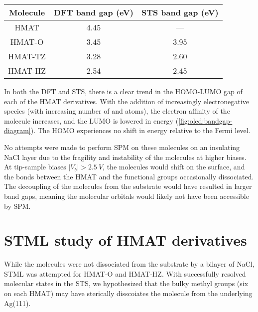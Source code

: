 \begin{table} [h]
\begin{center}
    \begin{tabular}{|c|c|c|} 
    \hline
        Molecule  &  DFT band gap (eV)  &  STS band gap (eV) \\
        \hline
        HMAT     &    4.45   &  --- \\
        HMAT-O   &    3.45   & 3.95 \\
        HMAT-TZ  &    3.28   & 2.60 \\
        HMAT-HZ  &    2.54   & 2.45 \\
        \hline
    \end{tabular}
    \caption{}
    \label{tab:oled:bandgaps}
    \end{center}
\end{table}

In both the \ac{DFT} and \ac{STS}, there is a clear trend in the HOMO-LUMO gap of each of the \ac{HMAT} derivatives. With the addition of increasingly electronegative species (with increasing number of  and  atoms), the electron affinity of the molecule increases, and the \ac{LUMO} is lowered in energy (\autoref{fig:oled:bandgap-diagram}). The \ac{HOMO} experiences no shift in energy relative to the Fermi level.

\begin{figure} [h]
    \centering
    \caption{}
    \label{fig:oled:bandgap-diagram}
\end{figure}

No attempts were made to perform \ac{SPM} on these molecules on an insulating NaCl layer due to the fragility and instability of the molecules at higher biases. At tip-sample biases $|V_b| > \SI{2.5}{V}$, the molecules would shift on the surface, and the bonds between the \ac{HMAT} and the functional groups occasionally dissociated. The decoupling of the molecules from the substrate would have resulted in larger band gaps, meaning the molecular orbitals would likely not have been accessible by \ac{SPM}.



\section{{STML} study of HMAT derivatives}

While the molecules were not dissociated from the substrate by a bilayer of NaCl, \ac{STML} was attempted for \ac{HMAT-O} and \ac{HMAT-HZ}. With successfully resolved molecular states in the \ac{STS}, we hypothesized that the bulky methyl groups (six on each \ac{HMAT}) may have sterically disscoiates the molecule from the underlying Ag(111).

